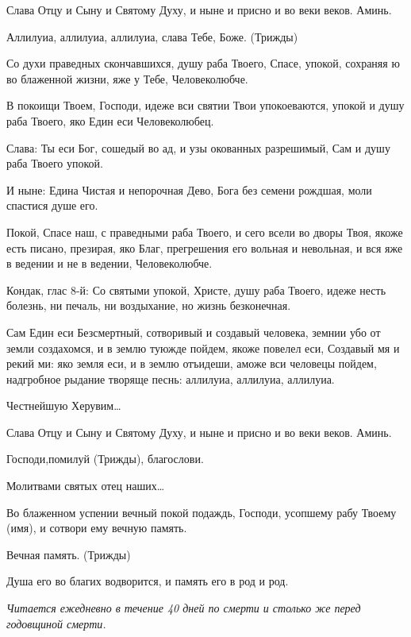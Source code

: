 Слава Отцу и Сыну и Святому Духу, и ныне и присно и во веки веков. Аминь. 

Аллилуиа, аллилуиа, аллилуиа, слава Тебе, Боже. (Трижды)




Со духи праведных скончавшихся, душу раба Твоего, Спасе, упокой, сохраняя ю во блаженной жизни, яже у Тебе, Человеколюбче. 

В покоищи Твоем, Господи, идеже вси святии Твои упокоеваются, упокой и душу раба Твоего, яко Един еси Человеколюбец. 

Слава: Ты еси Бог, сошедый во ад, и узы окованных разрешимый, Сам и душу раба Твоего упокой. 

И ныне: Едина Чистая и непорочная Дево, Бога без семени рождшая, моли спастися душе его.




Покой, Спасе наш, с праведными раба Твоего, и сего всели во дворы Твоя, якоже есть писано, презирая, яко Благ, прегрешения его вольная и невольная, и вся яже в ведении и не в ведении, Человеколюбче. 

Кондак, глас 8-й: Со святыми упокой, Христе, душу раба Твоего, идеже несть болезнь, ни печаль, ни воздыхание, но жизнь безконечная.




Сам Един еси Безсмертный, сотворивый и создавый человека, земнии убо от земли создахомся, и в землю туюжде пойдем, якоже повелел еси, Создавый мя и рекий ми: яко земля еси, и в землю отъидеши, аможе вси человецы пойдем, надгробное рыдание творяще песнь: аллилуиа, аллилуиа, аллилуиа. 

Честнейшую Херувим… 

Слава Отцу и Сыну и Святому Духу, и ныне и присно и во веки веков. Аминь. 

Господи,помилуй (Трижды), благослови. 

Молитвами святых отец наших… 

Во блаженном успении вечный покой подаждь, Господи, усопшему рабу Твоему (имя), и сотвори ему вечную память. 

Вечная память. (Трижды) 

Душа его во благих водворится, и память его в род и род. 
\mychapterending

 


\itshape Читается ежедневно в течение 40 дней по смерти и столько же перед годовщиной смерти.\normalfont{} 

